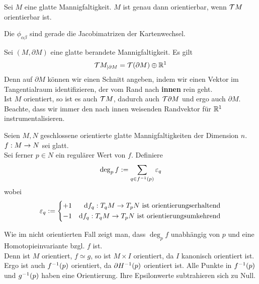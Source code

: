 \Prop{}
Sei $M$ eine glatte Mannigfaltigkeit. $M$ ist genau dann orientierbar, wenn $\mathcal{T} M$ orientierbar ist.
\begin{Beweis}{}
	Die $\phi_{\alpha \beta}$ sind gerade die Jacobimatrizen der Kartenwechsel.
\end{Beweis}

\Bem{}
Sei $(M,\partial M)$ eine glatte berandete Mannigfaltigkeit. Es gilt
\[ \mathcal{T} M_{|\partial M} = \mathcal{T}(\partial M) \oplus \mathbb{R}^1 \]
Denn auf $\partial M$ können wir einen Schnitt angeben, indem wir einen Vektor im Tangentialraum identifizieren, der vom Rand nach \textbf{innen} rein geht.\\
Ist $M$ orientiert, so ist es auch $\mathcal{T} M$, dadurch auch $\mathcal{T}\partial M$ und ergo auch $\partial M$. Beachte, dass wir immer den nach innen weisenden Randvektor für $\mathbb{R}^1$ instrumentalisieren.

\Def{}
Seien $M, N$ geschlossene orientierte glatte Mannigfaltigkeiten der Dimension $n$.\\
$f : M\overset{}{\rightarrow} N $ sei glatt.\\
Sei ferner $p \in N$ ein regulärer Wert von $f$. Definiere
\[ \deg_p f := \sum_{q \in f^{-1}(p)} \varepsilon_q \]
wobei
\[
\varepsilon_q :=
\left\lbrace
\begin{aligned}
+1 && \text{d} f_q : T_q M \overset{}{\rightarrow} T_p N \text{ ist orientierungserhaltend}\\
-1 && \text{d} f_q : T_q M \overset{}{\rightarrow} T_p N \text{ ist orientierungsumkehrend}
\end{aligned}
\right.\]

\Bem{}
Wie im nicht orientierten Fall zeigt man, dass $\deg_p f$ unabhängig von $p$ und eine Homotopieinvariante bzgl. $f$ ist.\\
Denn ist $M$ orientiert, $f\simeq g$, so ist $M \times I$ orientiert, da $I$ kanonisch orientiert ist. Ergo ist auch $f^{-1}(p)$ orientiert, da $\partial H^{-1}(p)$ orientiert ist. Alle Punkte in $f^{-1}(p)$ und $g^{-1}(p)$ haben eine Orientierung. Ihre Epsilonwerte subtrahieren sich zu Null. 